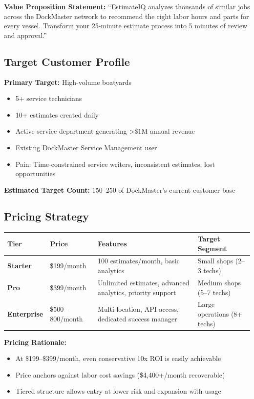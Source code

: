 \documentclass[11pt,a4paper]{article}
\begin{document}
\textbf{Value Proposition Statement:}
``EstimateIQ analyzes thousands of similar jobs across the DockMaster network to recommend the right labor hours and parts for every vessel. Transform your 25-minute estimate process into 5 minutes of review and approval.''

\subsection{Target Customer Profile}

\textbf{Primary Target:} High-volume boatyards
\begin{itemize}[leftmargin=*]
    \item 5+ service technicians
    \item 10+ estimates created daily
    \item Active service department generating >\$1M annual revenue
    \item Existing DockMaster Service Management user
    \item Pain: Time-constrained service writers, inconsistent estimates, lost opportunities
\end{itemize}

\textbf{Estimated Target Count:} 150--250 of DockMaster's current customer base

\subsection{Pricing Strategy}

\begin{table}[H]
\centering
\begin{tabularx}{\textwidth}{@{}L{2.5cm}C{2.5cm}L{5cm}L{3.5cm}@{}}
\toprule
\textbf{Tier} & \textbf{Price} & \textbf{Features} & \textbf{Target Segment} \\
\midrule
\textbf{Starter} & \$199/month & 100 estimates/month, basic analytics & Small shops (2--3 techs) \\
\textbf{Pro} & \$399/month & Unlimited estimates, advanced analytics, priority support & Medium shops (5--7 techs) \\
\textbf{Enterprise} & \$500--800/month & Multi-location, API access, dedicated success manager & Large operations (8+ techs) \\
\bottomrule
\end{tabularx}
\end{table}

\textbf{Pricing Rationale:}
\begin{itemize}[leftmargin=*]
    \item At \$199--\$399/month, even conservative 10x ROI is easily achievable
    \item Price anchors against labor cost savings (\$4,400+/month recoverable)
    \item Tiered structure allows entry at lower risk and expansion with usage
\end{itemize}
\end{document}

